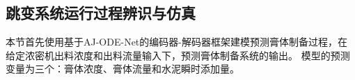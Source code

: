 
\subsection{跳变系统运行过程辨识与仿真}
\label{sec:case-study1}
本节首先使用基于AJ-ODE-Net的编码器-解码器框架建模预测膏体制备过程，在给定浓密机出料浓度和出料流量输入下，预测膏体制备系统的输出。
模型的预测变量为三个：膏体浓度、膏体流量和水泥瞬时添加量。

